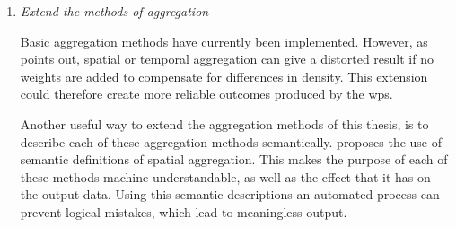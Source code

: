 \begin{enumerate}
	\item \textit{Extend the methods of aggregation}
	\label{par:FRaggregation}
	
	Basic aggregation methods have currently been implemented. However, as \cite{SW:Ganesan} points out, spatial or temporal aggregation can give a distorted result if no weights are added to compensate for differences in density. This extension could therefore create more reliable outcomes produced by the \ac{wps}. 
	
	Another useful way to extend the aggregation methods of this thesis, is to describe each of these aggregation methods semantically. \cite{SSW:Stasch4} proposes the use of semantic definitions of spatial aggregation. This makes the purpose of each of these methods machine understandable, as well as the effect that it has on the output data. Using this semantic descriptions an automated process can prevent logical mistakes, which lead to meaningless output.
\end{enumerate} 

